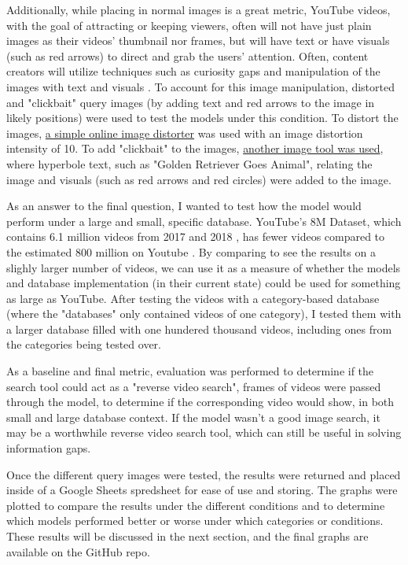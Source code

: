 \documentclass[10pt,twocolumn]{article}
\begin{document}
Additionally, while placing in normal images is a great metric, YouTube videos, with the goal of attracting or keeping viewers, often will not have just plain images as their videos' thumbnail nor frames, but will have text or have visuals (such as red arrows) to direct and grab the users' attention. Often, content creators will utilize techniques such as curiosity gaps and manipulation of the images with text and visuals \cite{Mowar2021}. To account for this image manipulation, distorted and "clickbait" query images (by adding text and red arrows to the image in likely positions) were used to test the models under this condition. To distort the images, \href{https://www.imgonline.com.ua/eng/picture-distortion.php}{a simple online image distorter} was used with an image distortion intensity of 10. To add "clickbait" to the images, \href{https://www.visualwatermark.com/add-text-to-photos/}{another image tool was used}, where hyperbole text, such as "Golden Retriever Goes Animal", relating the image and visuals (such as red arrows and red circles) were added to the image.

As an answer to the final question, I wanted to test how the model would perform under a large and small, specific database. YouTube’s 8M Dataset, which contains 6.1 million videos from 2017 and 2018 \cite{googleYT8M}, has fewer videos compared to the estimated 800 million on Youtube \cite{EarthWeb TODO}. By comparing to see the results on a slighly larger number of videos, we can use it as a measure of whether the models and database implementation (in their current state) could be used for something as large as YouTube. After testing the videos with a category-based database (where the "databases" only contained videos of one category), I tested them with a larger database filled with one hundered thousand videos, including ones from the categories being tested over. 

As a baseline and final metric, evaluation was performed to determine if the search tool could act as a "reverse video search", frames of videos were passed through the model, to determine if the corresponding video would show, in both small and large database context. If the model wasn't a good image search, it may be a worthwhile reverse video search tool, which can still be useful in solving information gaps.

Once the different query images were tested, the results were returned and placed inside of a Google Sheets spredsheet for ease of use and storing. The graphs were plotted to compare the results under the different conditions and to determine which models performed better or worse under which categories or conditions. These results will be discussed in the next section, and the final graphs are available on the GitHub repo.
\end{document}
